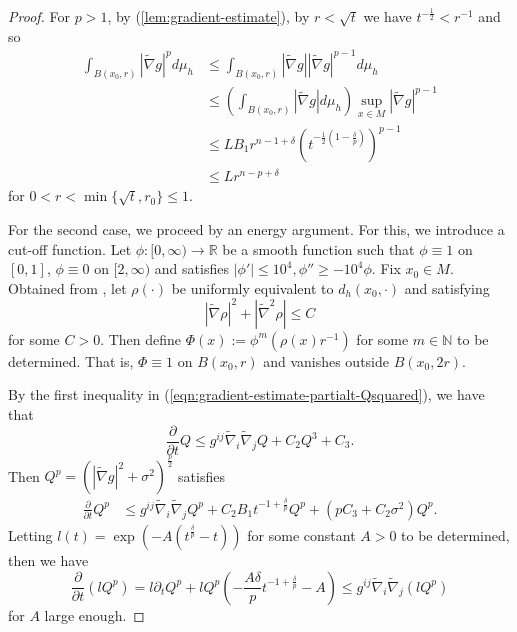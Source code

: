 \documentclass[12pt]{amsart}
\theoremstyle{plain}
\theoremstyle{plain}
\theoremstyle{definition}
\theoremstyle{remark}
\numberwithin{equation}{subsection}
\newcommand{\hdel}{\tilde{\nabla}}
\begin{document}
\begin{proof}
    For $p > 1$, by (\ref{lem:gradient-estimate}), by $r < \sqrt{t}$ we have $t^{-\frac{1}{2}} < r^{-1}$ and so
    \begin{align*}
        \int_{B(x_0,r)}|\hdel g|^pd\mu_h &\leq \int_{B(x_0,r)}|\hdel g||\hdel g|^{p-1}d\mu_h \nonumber \\
        &\leq \left(\int_{B(x_0,r)}|\hdel g|d\mu_h\right)\sup\limits_{x\in M}|\hdel g|^{p-1} \nonumber \\
        &\leq LB_1 r^{n-1+\delta}\left(t^{-\frac{1}{2}\left(1-\frac{\delta}{p}\right)}\right)^{p-1} \nonumber \\
        &\leq L r^{n-p+\delta}
    \end{align*}
    for $0 < r < \min\{\sqrt{t}, r_0\} \leq 1$.
    
    For the second case, we proceed by an energy argument. For this, we introduce a cut-off function. Let $\phi:[0,\infty)\to\mathbb{R}$ be a smooth function such that $\phi \equiv 1$ on $[0,1]$, $\phi \equiv 0$ on $[2,\infty)$ and satisfies $|\phi'|\leq 10^4, \phi'' \geq -10^4\phi$. Fix $x_0 \in M$. Obtained from \cite{tam_exhaustion_2010}, let $\rho(\cdot)$ be uniformly equivalent to $d_h(x_0, \cdot)$ and satisfying
    \begin{equation*}
        |\hdel \rho|^2 + |\hdel^2 \rho| \leq C
    \end{equation*}
    for some $C > 0$. Then define $\Phi(x) := \phi^m(\rho(x)r^{-1})$ for some $m \in \mathbb{N}$ to be determined. That is, $\Phi \equiv 1$ on $B(x_0, r)$ and vanishes outside $B(x_0, 2r)$. 

    By the first inequality in (\ref{eqn:gradient-estimate-partialt-Qsquared}), we have that
    \begin{equation*}
        \frac{\partial}{\partial t}Q  \leq g^{ij}\hdel_i\hdel_j Q + C_2Q^3 + C_3.
    \end{equation*}
    Then $Q^p = \left(|\hdel g|^2 + \sigma^2\right)^\frac{p}{2}$ satisfies
    \begin{align*}
        \frac{\partial}{\partial t} Q^p &\leq g^{ij}\hdel_i\hdel_j Q^p + C_2B_1t^{-1+\frac{\delta}{p}}Q^p + (pC_3 + C_2\sigma^2)Q^p.
    \end{align*}
    Letting $l(t) = \exp\left(-A(t^\frac{\delta}{p}-t)\right)$ for some constant $A > 0$ to be determined, then we have
    \begin{equation}\label{eqn:morrey-preservation-partialt-lQp}
        \frac{\partial}{\partial t} (lQ^p) = l\partial_t Q^p + lQ^p\left(-\frac{A\delta}{p}t^{-1+\frac{\delta}{p}} - A\right) \leq g^{ij}\hdel_i\hdel_j(lQ^p)
    \end{equation}
    for $A$ large enough.
    

\end{proof}
\end{document}
